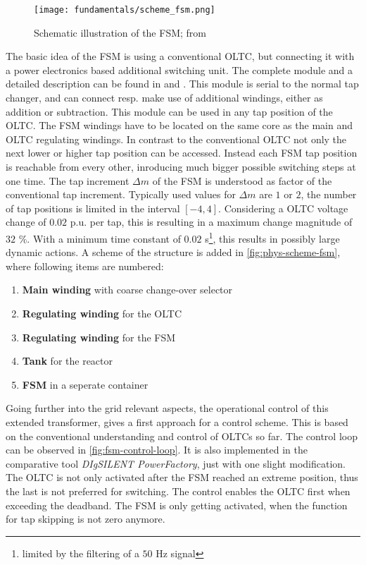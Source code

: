 \begin{figure} 
    \centering
    \texttt{[image: fundamentals/scheme\_fsm.png]}
    \caption[Schematic illustration of the \acs{FSM}]{Schematic illustration of the \acs{FSM}; from \autocite{burlakin_2024a}}
    \label{fig:phys-scheme-fsm}
\end{figure}
The basic idea of the \acf{FSM} is using a conventional \acs{OLTC}, but connecting it with a power electronics based additional switching unit.
The complete module and a detailed description can be found in \autocite{burlakin_2024a} and \autocite{maschinenfabrikreinhausengmbh_2023}.
This module is serial to the normal tap changer, and can connect resp. make use of additional windings, either as addition or subtraction.
This module can be used in any tap position of the \acs{OLTC}.
The \acs{FSM} windings have to be located on the same core as the main and \acs{OLTC} regulating windings.
In contrast to the conventional \acs{OLTC} not only the next lower or higher tap position can be accessed.
Instead each \acs{FSM} tap position is reachable from every other, inroducing much bigger possible switching steps at one time.
The tap increment $\Delta m$ of the \acs{FSM} is understood as factor of the conventional tap increment.
Typically used values for $\Delta m$ are $1$ or $2$, the number of tap positions is limited in the interval $[-4,4]$.
Considering a \acs{OLTC} voltage change of $0.02$ p.u. per tap, this is resulting in a maximum change magnitude of $32$ \%.
With a minimum time constant of $0.02$ s\footnote{limited by the filtering of a $50$ Hz signal}, this results in possibly large dynamic actions.
A scheme of the structure is added in \autoref{fig:phys-scheme-fsm}, where following items are numbered:
\begin{enumerate}[label=\protect\circled{\arabic*}]
    \item \textbf{Main winding} with coarse change-over selector
    \item \textbf{Regulating winding} for the \acs{OLTC}
    \item \textbf{Regulating winding} for the \acs{FSM}
    \item \textbf{Tank} for the reactor
    \item \textbf{\acs{FSM}} in a seperate container
\end{enumerate}

Going further into the grid relevant aspects, the operational control of this extended transformer, \textcite{burlakin_2024} gives a first approach for a control scheme.
This is based on the conventional understanding and control of \acsp{OLTC} so far.
The control loop can be observed in \autoref{fig:fsm-control-loop}.
It is also implemented in the comparative tool \textit{DIgSILENT PowerFactory}, just with one slight modification.
The \acs{OLTC} is not only activated after the \acs{FSM} reached an extreme position, thus the last is not preferred for switching.
The control enables the \acs{OLTC} first when exceeding the deadband.
The \acs{FSM} is only getting activated, when the function for tap skipping is not zero anymore.

